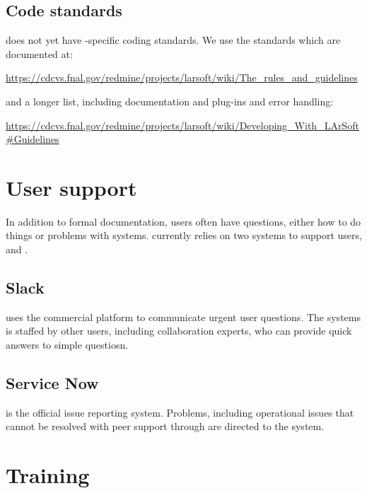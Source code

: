 \documentclass[../main-v1.tex]{subfiles}
\begin{document}
\subsection{Code standards}

 does not yet have -specific coding standards.  We use the  standards which are documented at:

\href{ 
https://cdcvs.fnal.gov/redmine/projects/larsoft/wiki/The_rules_and_guidelines}{https://cdcvs.fnal.gov/redmine/projects/larsoft/wiki/The\_rules\_and\_guidelines}

 

and a longer list, including documentation and plug-ins and error handling:

 

\href{https://cdcvs.fnal.gov/redmine/projects/larsoft/wiki/Developing_With_LArSoft#Guidelines}{https://cdcvs.fnal.gov/redmine/projects/larsoft/wiki/Developing\_With\_LArSoft\#Guidelines}

\section{User support}

In addition to formal documentation, users often have questions, either how to do things or problems with systems.   currently relies on two systems to support users,  and .  

\subsection{Slack}
 uses the commercial  platform to communicate urgent user questions.  The  systems is staffed by other users, including collaboration experts, who can provide quick answers to simple questiosn. 

\subsection{Service Now}
 is the official  issue reporting system. Problems, including operational issues that cannot be resolved with peer support through  are directed to the  system.




\section{Training }
\end{document}
